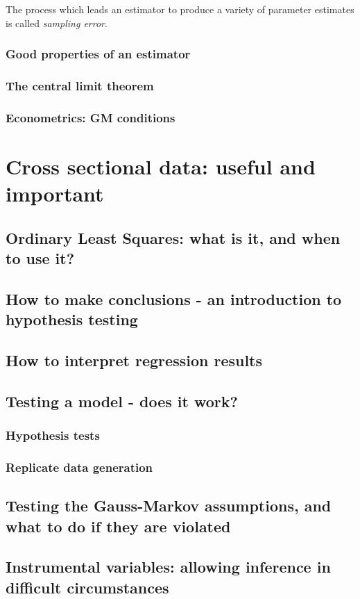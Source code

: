\documentclass[11pt,fullpage]{book}
\begin{document}
The process which leads an estimator to produce a variety of parameter estimates is called \textit{sampling error}. 

\section{Good properties of an estimator}
\section{The central limit theorem}\label{sec:Estimators_CLT}
\section{Econometrics: GM conditions}

\part{Cross sectional data: useful and important}
\chapter{Ordinary Least Squares: what is it, and when to use it?}\label{chap:OLS}
\chapter{How to make conclusions - an introduction to hypothesis testing}
\chapter{How to interpret regression results}
\chapter{Testing a model - does it work?}\label{chap:ModelTesting}
\section{Hypothesis tests}
\section{Replicate data generation}
\chapter{Testing the Gauss-Markov assumptions, and what to do if they are violated}
\chapter{Instrumental variables: allowing inference in difficult circumstances}
\end{document}
